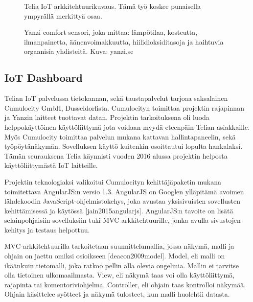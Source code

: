 \documentclass{tktltiki}
\begin{document}
\begin{figure}[h]
\begin{center}
\caption{Telia IoT arkkitehtuurikuvaus. Tämä työ koskee punaisella ympyrällä merkittyä osaa.}
\label{Arkkitehtuurikuvaus}
\end{center}
\end{figure}


\begin{figure}[h]
\begin{center}
\caption{Yanzi comfort sensori, joka mittaa: lämpötilaa, kosteutta, ilmanpainetta, äänenvoimakkuutta, hiilidioksiditasoja ja haihtuvia orgaanisia yhdisteitä. Kuva: yanzi.se}
\label{Yanzi sensori}
\end{center}
\end{figure}
\clearpage

\subsection{IoT Dashboard}

Telian IoT palvelussa tietokannan, sekä taustapalvelut tarjoaa saksalainen Cumulocity GmbH, Dusseldorfista. Cumulocityn toimittaa projektin rajapinnan ja Yanzin laitteet tuottavat datan. Projektin tarkoituksena oli luoda helppokäyttöinen käyttöliittymä jota voidaan myydä eteenpäin Telian asiakkaille. Myös Cumulocity toimittaa palvelun mukana kattavan hallintapaneelin, sekä työpöytänäkymän. Sovelluksen käyttö kuitenkin osoittautui lopulta hankalaksi. Tämän seurauksena Telia käynnisti vuoden 2016 alussa projektin helposta käyttöliittymästä IoT laitteille. 

Projektin teknologiaksi valikoitui Cumulocityn kehittäjäpaketin mukana toimitettava AngularJS:n versio 1.3. AngularJS on Googlen ylläpitämä avoimen lähdekoodin JavaScript-ohjelmistokehys, joka avustaa yksisivuisten sovellusten kehittämisessä ja käytössä [jain2015angularjs]. AngularJS:n tavoite on lisätä selainpohjaisiin sovelluksiin tuki MVC-arkkitehtuurille, jonka avulla sivustojen kehitys ja testaus helpottuu. 

MVC-arkkitehtuurilla tarkoitetaan suunnittelumallia, jossa näkymä, malli ja ohjain on jaettu omiksi osioikseen [deacon2009model]. Model, eli malli on ikäänkuin tietomalli, joka ratkoo pellin alla olevia ongelmia. Mallin ei tarvitse olla tietoinen ulkomaailmasta. View, eli näkymä taas voi olla käyttöliittymä, rajapinta tai komentoriviohjelma. Controller, eli ohjain taas kontrolloi näkymää. Ohjain käsittelee syötteet ja näkymä tulosteet, kun malli huolehtii datasta. 
\end{document}
